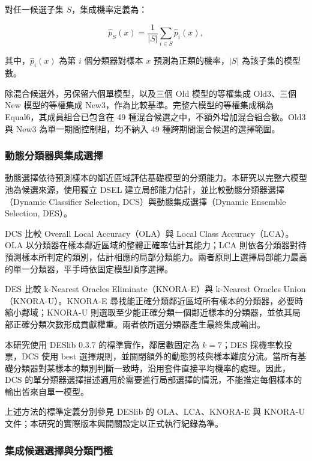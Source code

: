 對任一候選子集 \(S\)，集成機率定義為：

\begin{equation}\label{eq:method-probability}
\hat p_S(x)=\frac{1}{|S|}\sum_{i\in S}\hat p_i(x),
\end{equation}

其中，\(\hat p_i(x)\) 為第 \(i\) 個分類器對樣本 \(x\) 預測為正類的機率，\(|S|\) 為該子集的模型數。

除混合候選外，另保留六個單模型，以及三個 Old 模型的等權集成 Old3、三個 New 模型的等權集成 New3，作為比較基準。完整六模型的等權集成稱為 Equal6，其成員組合已包含在 49 種混合候選之中，不額外增加混合組合數。Old3 與 New3 為單一期間控制組，均不納入 49 種跨期間混合候選的選擇範圍。

\subsubsection{動態分類器與集成選擇}

動態選擇依待預測樣本的鄰近區域評估基礎模型的分類能力。本研究以完整六模型池為候選來源，使用獨立 DSEL 建立局部能力估計，並比較動態分類器選擇（Dynamic Classifier Selection, DCS）與動態集成選擇（Dynamic Ensemble Selection, DES）。

DCS 比較 Overall Local Accuracy（OLA）與 Local Class Accuracy（LCA）。OLA 以分類器在樣本鄰近區域的整體正確率估計其能力；LCA 則依各分類器對待預測樣本所判定的類別，估計相應的局部分類能力。兩者原則上選擇局部能力最高的單一分類器，平手時依固定模型順序選擇。

DES 比較 k-Nearest Oracles Eliminate（KNORA-E）與 k-Nearest Oracles Union（KNORA-U）。KNORA-E 尋找能正確分類鄰近區域所有樣本的分類器，必要時縮小鄰域；KNORA-U 則選取至少能正確分類一個鄰近樣本的分類器，並依其局部正確分類次數形成貢獻權重。兩者依所選分類器產生最終集成輸出。

本研究使用 DESlib 0.3.7 的標準實作，鄰居數固定為 \(k=7\)；DES 採機率軟投票，DCS 使用 {\normalfont best} 選擇規則，並關閉額外的動態剪枝與樣本難度分流。當所有基礎分類器對某樣本的類別判斷一致時，沿用套件直接平均機率的處理。因此，DCS 的單分類器選擇描述適用於需要進行局部選擇的情況，不能推定每個樣本的輸出皆來自單一模型。

上述方法的標準定義分別參見 DESlib 的 OLA\autocite{deslib-ola-docs}、LCA\autocite{deslib-lca-docs}、KNORA-E\autocite{deslib-knorae-docs} 與 KNORA-U\autocite{deslib-knorau-docs} 文件；本研究的實際版本與開關設定以正式執行紀錄為準。

\subsubsection{集成候選選擇與分類門檻}

